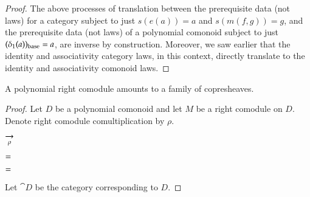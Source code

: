 \documentclass{amsart}
\begin{document}
\begin{proof}
  The above processes of translation between the prerequisite data
  (not laws) for a category subject to just $s(e(a)) = a$ and
  $s(m(f, g)) = g$, and the prerequisite data (not laws) of a
  polynomial comonoid subject to just
  $({\delta}_1(a))_{\mathrm{base}} = a$, are inverse by
  construction. Moreover, we saw earlier that the identity and
  associativity category laws, in this context, directly translate
  to the identity and associativity comonoid laws.
\end{proof}

\begin{prop}
  A polynomial right comodule amounts to a family of copresheaves.
\end{prop}
\begin{proof}
  Let $D$ be a polynomial comonoid and let $M$ be a right comodule on
  $D$. Denote right comodule comultiplication by $\rho$.

  \begin{center}
    
    \hspace{-.75em}
    $\underset{\rho}{\to}$
    \hspace{.5em}
    
  \end{center}

  \begin{center}
    
    $=$
    \quad
    
  \end{center}

  \begin{center}
    
    \quad
    $=$
    \quad
    
  \end{center}

  Let $\cat{D}$ be the category corresponding to $D$. 
  
\end{proof}
\end{document}
